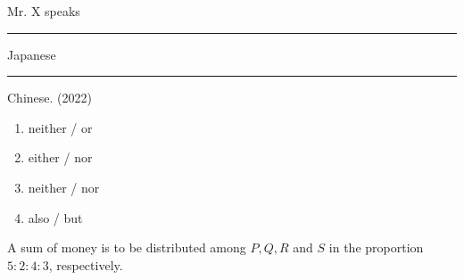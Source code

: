 \iffalse

\chapter{2022}
\author{AI24BTECH11004}
\section{st}
\fi


       \item Mr. X speaks \rule{1cm}{0.15mm} Japanese \rule{1cm}{0.15mm} Chinese.
       \hfill{(2022)}
       \begin{enumerate}
           \item neither / or
           \item either / nor
           \item neither / nor
           \item also / but
       \end{enumerate}

       \item A sum of money is to be distributed among $P, Q, R$ and $S$ in the proportion $5: 2 : 4 :3$, respectively.

